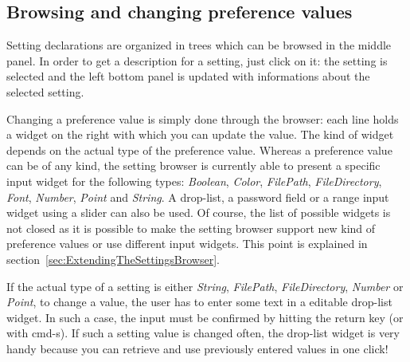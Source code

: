 \documentclass[a4paper,10pt,twoside]{book}
\begin{document}
\subsection{Browsing and changing preference values}
Setting declarations are organized in trees which can be browsed in the middle panel. In order to get a description for a setting, just click on it: the setting is selected and the left bottom panel is updated with informations about the selected setting. 

Changing a preference value is simply done through the browser: each line holds a widget on the right with which you can update the value. The kind of widget depends on the actual type of the preference value. Whereas a preference value can be of any kind, the setting browser is currently able to present a specific input widget for the following types: \textit{Boolean}, \textit{Color}, \textit{FilePath}, \textit{FileDirectory}, \textit{Font}, \textit{Number}, \textit{Point} and \textit{String}. A drop-list, a password field or a range input widget using a slider can also be used. Of course, the list of possible widgets is not closed as it is possible to make the setting browser support new kind of preference values or use different input widgets. This point is explained in section~\ref{sec:ExtendingTheSettingsBrowser}.

If the actual type of a setting is either \textit{String}, \textit{FilePath}, \textit{FileDirectory}, \textit{Number} or \textit{Point},  to change a value, the user has to enter some text in a editable drop-list widget. In such a case, the input must be confirmed by hitting the return key (or with cmd-s). If such a setting value is changed often, the drop-list widget is very handy because you can retrieve and use previously entered values in one click!
\end{document}

